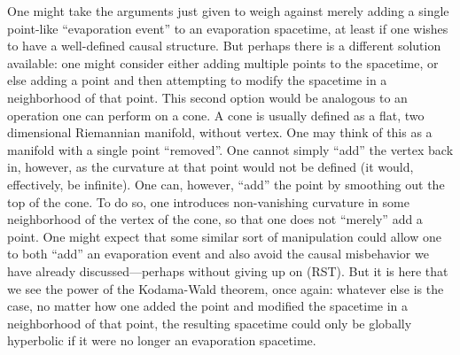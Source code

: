 \documentclass[authoryear,12pt,3p]{jowarticle}
\begin{document}
One might take the arguments just given to weigh against merely adding a single point-like ``evaporation event'' to an evaporation spacetime, at least if one wishes to have a well-defined causal structure.  But perhaps there is a different solution available: one might consider either adding multiple points to the spacetime, or else adding a point and then attempting to modify the spacetime in a neighborhood of that point.  This second option would be analogous to an operation one can perform on a cone.  A cone is usually defined as a flat, two dimensional Riemannian manifold, without vertex.  One may think of this as a manifold with a single point ``removed''.  One cannot simply ``add'' the vertex back in, however, as the curvature at that point would not be defined (it would, effectively, be infinite).  One can, however, ``add'' the point by smoothing out the top of the cone.  To do so, one introduces non-vanishing curvature in some neighborhood of the vertex of the cone, so that one does not ``merely'' add a point.  One might expect that some similar sort of manipulation could allow one to both ``add'' an evaporation event and also avoid the causal misbehavior we have already discussed---perhaps without giving up on (RST).  But it is here that we see the power of the Kodama-Wald theorem, once again: whatever else is the case, no matter how one added the point and modified the spacetime in a neighborhood of that point, the resulting spacetime could only be globally hyperbolic if it were no longer an evaporation spacetime.
\end{document}
